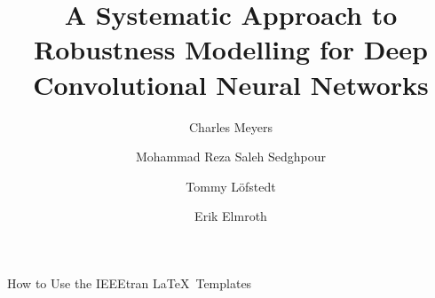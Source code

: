 \documentclass[lettersize,journal]{IEEEtran}
\begin{document}
\title{A Systematic Approach to Robustness Modelling for Deep Convolutional Neural Networks}
\author[1]{Charles Meyers}
\author[2]{Mohammad Reza Saleh Sedghpour}
\author[1]{Tommy L\"{o}fstedt}
\author[1]{Erik Elmroth}

%
{How to Use the IEEEtran \LaTeX \ Templates}

\maketitle









\end{document}
